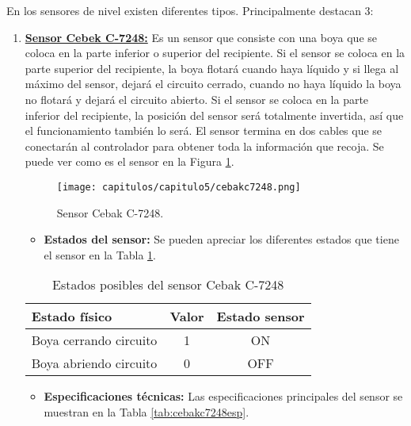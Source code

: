 En los sensores de nivel existen diferentes tipos. Principalmente destacan 3:


\begin{enumerate}
    \item \underline{\textbf{Sensor Cebek C-7248:}} Es un sensor que consiste con una boya que se coloca en la parte inferior o superior del recipiente. Si el sensor se coloca en la parte superior del recipiente, la boya flotará cuando haya líquido y si llega al máximo del sensor, dejará el circuito cerrado, cuando no haya líquido la boya no flotará y dejará el circuito abierto. Si el sensor se coloca en la parte inferior del recipiente, la posición del sensor será totalmente invertida, así que el funcionamiento también lo será. El sensor termina en dos cables que se conectarán al controlador para obtener toda la información que recoja. Se puede ver como es el sensor en la Figura \ref{fig:cebakc7248}.

\begin{figure}[h] 
    \centering
    \texttt{[image: capitulos/capitulo5/cebakc7248.png]}
    \caption{Sensor Cebak C-7248.}
    \label{fig:cebakc7248}
\end{figure}

\begin{itemize}
    \item \textbf{Estados del sensor:} Se pueden apreciar los diferentes estados que tiene el sensor en la Tabla \ref{tab:cebakc7248}.
\end{itemize}

\begin{table}[h]
    \centering
    \begin{tabular}{|l|c|c|}
        \rowcolor[gray]{.5}
        \hline
         \color{white}Estado físico&\color{white}Valor&\color{white}Estado sensor \\
         \hline
         Boya cerrando circuito&1&ON \\
         \hline
         Boya abriendo circuito&0&OFF  \\
         \hline
    \end{tabular}
    \caption{Estados posibles del sensor Cebak C-7248}
    \label{tab:cebakc7248}
\end{table}

\clearpage
\begin{itemize}
    \item \textbf{Especificaciones técnicas:} Las especificaciones principales del sensor se muestran en la Tabla \ref{tab:cebakc7248esp}.
\end{itemize}


\end{enumerate}
